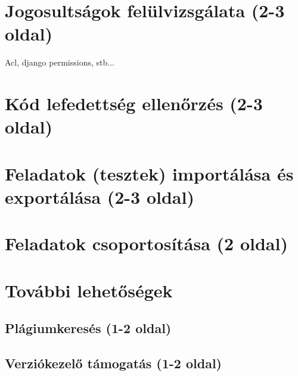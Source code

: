 \section{Jogosultságok felülvizsgálata (2-3 oldal)}\label{subsection:permissions}
Acl, django permissions, stb...

\section{Kód lefedettség ellenőrzés (2-3 oldal)}

\section{Feladatok (tesztek) importálása és exportálása (2-3 oldal)}

\section{Feladatok csoportosítása (2 oldal)}

\section{További lehetőségek}

\subsection{Plágiumkeresés (1-2 oldal)}

\subsection{Verziókezelő támogatás (1-2 oldal)}